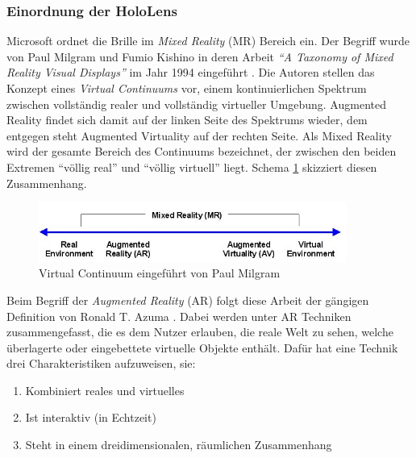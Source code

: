 \subsubsection{Einordnung der HoloLens}
\label{sec-2-1-1}
Microsoft ordnet die Brille im \textit{Mixed Reality} (MR) Bereich ein. Der Begriff  wurde von Paul Milgram und Fumio Kishino in deren Arbeit \textit{``A Taxonomy of Mixed Reality Visual Displays''} im Jahr 1994 eingeführt \cite{Milgram94}. Die Autoren stellen das Konzept eines \textit{Virtual Continuums} vor, einem kontinuierlichen Spektrum zwischen vollständig realer und vollständig virtueller Umgebung. Augmented Reality findet sich damit auf der linken Seite des Spektrums wieder, dem entgegen steht Augmented Virtuality auf der rechten Seite. Als Mixed Reality wird der gesamte Bereich des Continuums bezeichnet, der zwischen den beiden Extremen ``völlig real'' und ``völlig virtuell'' liegt. Schema \ref{img:virtual_continuum} skizziert diesen Zusammenhang.\\

\begin{figure}[h!]
	\centering
	\includegraphics[width=0.9\textwidth]{images/papers/virtual_continuum.png}
	\caption{Virtual Continuum eingeführt von Paul Milgram \cite{Milgram94}}
	\label{img:virtual_continuum}
\end{figure}

Beim Begriff der \textit{Augmented Reality} (AR) folgt diese Arbeit der gängigen Definition von Ronald T. Azuma \cite{Azuma97}. Dabei werden unter AR Techniken zusammengefasst, die es dem Nutzer erlauben, die reale Welt zu sehen, welche überlagerte oder eingebettete virtuelle Objekte enthält. Dafür hat eine Technik drei Charakteristiken aufzuweisen, sie:
\begin{enumerate}
	\setlength{\itemsep}{-5pt}
	\item Kombiniert reales und virtuelles
	\item Ist interaktiv (in Echtzeit)
	\item Steht in einem dreidimensionalen, räumlichen Zusammenhang
\end{enumerate}

